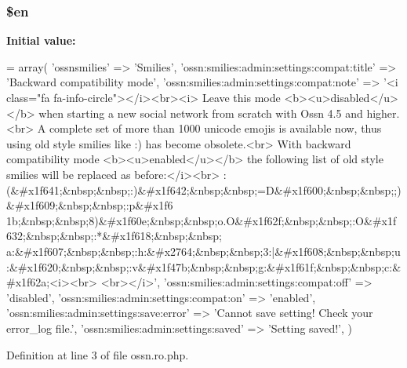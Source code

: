 \subsubsection[{\texorpdfstring{\$en}{$en}}]{\setlength{\rightskip}{0pt plus 5cm}\$en}\hypertarget{components_2_ossn_smilies_2locale_2ossn_8ro_8php_a48abc714dfb71c8fffa83cf49f452115}{}\label{components_2_ossn_smilies_2locale_2ossn_8ro_8php_a48abc714dfb71c8fffa83cf49f452115}
{\bfseries Initial value\+:}
\begin{DoxyCode}
= array(
        \textcolor{stringliteral}{'ossnsmilies'} => \textcolor{stringliteral}{'Smilies'},
        \textcolor{stringliteral}{'ossn:smilies:admin:settings:compat:title'} => \textcolor{stringliteral}{'Backward compatibility mode'},
        \textcolor{stringliteral}{'ossn:smilies:admin:settings:compat:note'} => \textcolor{stringliteral}{'<i class="fa fa-info-circle"></i><br><i>}
\textcolor{stringliteral}{        Leave this mode <b><u>disabled</u></b> when starting a new social network from scratch with Ossn
       4.5 and higher.<br>}
\textcolor{stringliteral}{        A complete set of more than 1000 unicode emojis is available now, thus using old style smilies like
       :) has become obsolete.<br>}
\textcolor{stringliteral}{        With backward compatibility mode <b><u>enabled</u></b> the following list of old style smilies will
       be replaced as before:</i><br>}
\textcolor{stringliteral}{        
      :(&#x1f641;&nbsp;&nbsp;:)&#x1f642;&nbsp;&nbsp;=D&#x1f600;&nbsp;&nbsp;;)&#x1f609;&nbsp;&nbsp;:p&#x1f6
      1b;&nbsp;&nbsp;8)&#x1f60e;&nbsp;&nbsp;o.O&#x1f62f;&nbsp;&nbsp;:O&#x1f632;&nbsp;&nbsp;:*&#x1f618;&nbsp;&nbsp;
      a:&#x1f607;&nbsp;&nbsp;:h:&#x2764;&nbsp;&nbsp;3:|&#x1f608;&nbsp;&nbsp;u:&#x1f620;&nbsp;&nbsp;:v&#x1f47b;&nbsp;&nbsp;g:&#x1f61f;&nbsp;&nbsp;c:&#x1f62a;<i><br>}
\textcolor{stringliteral}{        <br></i>'},
        \textcolor{stringliteral}{'ossn:smilies:admin:settings:compat:off'} => \textcolor{stringliteral}{'disabled'},
        \textcolor{stringliteral}{'ossn:smilies:admin:settings:compat:on'} => \textcolor{stringliteral}{'enabled'},
        \textcolor{stringliteral}{'ossn:smilies:admin:settings:save:error'} => \textcolor{stringliteral}{'Cannot save setting! Check your error\_log file.'},
        \textcolor{stringliteral}{'ossn:smilies:admin:settings:saved'} => \textcolor{stringliteral}{'Setting saved!'},
)
\end{DoxyCode}


Definition at line 3 of file ossn.\+ro.\+php.

